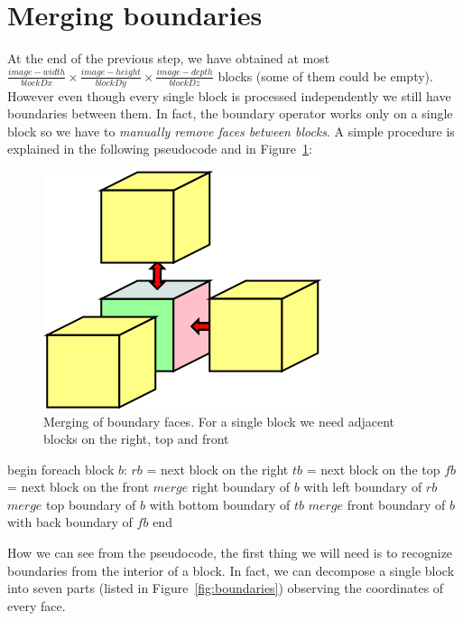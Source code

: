 \section{Merging boundaries}\label{sec33:Boundaries}

At the end of the previous step, we have obtained at most $\displaystyle\frac{image-width}{blockDx} \times \displaystyle\frac{image-height}{blockDy} \times \displaystyle\frac{image-depth}{blockDz}$ blocks (some of them could be empty). However even though every single block is processed independently we still have boundaries between them. In fact, the boundary operator works only on a single block so we have to \textit{manually remove faces between blocks}. A simple procedure is explained in the following pseudocode and in Figure~\ref{fig:boundaryMergeIteration}:\newpage

\begin{figure}[htb] %
   \centering
   \includegraphics[width=0.30\linewidth]{images/BoundaryMergeIteration.png}
   \caption[Merging of boundary faces]{Merging of boundary faces. For a single block we need adjacent blocks on the right, top and front}
   \label{fig:boundaryMergeIteration}
\end{figure}

\begin{pseudo}[caption={Removal of internal boundaries}, label={lst:boundaryRemoval}]
begin
  foreach block $b$:
    $rb$ = next block on the right
    $tb$ = next block on the top
    $fb$ = next block on the front
    $merge$ right boundary of $b$ with left boundary of $rb$
    $merge$ top boundary of $b$ with bottom boundary of $tb$
    $merge$ front boundary of $b$ with back boundary of $fb$
end
\end{pseudo}

How we can see from the pseudocode, the first thing we will need is to recognize boundaries from the interior of a block. In fact, we can decompose a single block into seven parts (listed in Figure~\ref{fig:boundaries}) observing the coordinates of every face.

